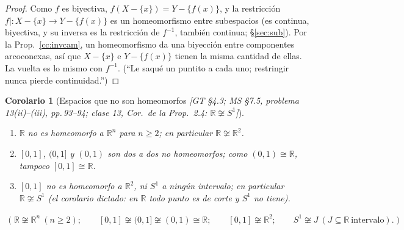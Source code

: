 \documentclass[11pt,a4paper]{article}
\newcommand{\lgc}[1]{\par\vspace{-3pt}\begin{gather*}\big(\;#1\;\big)\end{gather*}\vspace{-6pt}}
\newcommand{\figtit}[1]{\par\vspace{2pt}{\footnotesize\itshape #1}\par}
\theoremstyle{definition}
\theoremstyle{plain}
\newtheorem{corolario}[definicion]{Corolario}
\newcommand{\fnt}[1]{{\normalfont\small\itshape\color{gray!150!black}[#1]}}
\newcommand{\R}{\mathbb{R}}
\begin{document}
\begin{proof}
Como $f$ es biyectiva, $f(X-\{x\})=Y-\{f(x)\}$, y la restricción $f|:X-\{x\}\to Y-\{f(x)\}$ es un homeomorfismo entre subespacios (es continua, biyectiva, y su inversa es la restricción de $f^{-1}$, también continua; \S\ref{sec:sub}). Por la Prop.~\ref{cc:invcam}, un homeomorfismo da una biyección entre componentes arcoconexas, así que $X-\{x\}$ e $Y-\{f(x)\}$ tienen la misma cantidad de ellas. La vuelta es lo mismo con $f^{-1}$. (``Le saqué un puntito a cada uno; restringir nunca pierde continuidad.'')
\end{proof}

\begin{figure}[ht]
\centering
{}
\figtit{Figura 26. Invarianza de los puntos de corte (dibujo de la clase 13): al sacar $x$ y $f(x)$, la restricción $\tilde f$ sigue siendo un homeomorfismo, y dos componentes de un lado son dos del otro.}
\end{figure}

\begin{corolario}[Espacios que no son homeomorfos \fnt{GT \S4.3; MS \S7.5, problema 13(ii)--(iii), pp.\,93--94; clase 13, Cor.\ de la Prop.\ 2.4: $\R\not\cong S^1$}]\label{cc:nohomeo}
\begin{enumerate}[label=(\alph*),leftmargin=2.2em,itemsep=0pt]
\item $\R$ no es homeomorfo a $\R^n$ para $n\ge2$; en particular $\R\not\cong\R^2$.
\item $[0,1]$, $(0,1]$ y $(0,1)$ son dos a dos no homeomorfos; como $(0,1)\cong\R$, tampoco $[0,1]\cong\R$.
\item $[0,1]$ no es homeomorfo a $\R^2$, ni $S^1$ a ningún intervalo; en particular $\R\not\cong S^1$ (el corolario dictado: en $\R$ todo punto es de corte y $S^1$ no tiene).
\end{enumerate}
\lgc{\R\not\cong\R^n\ (n\ge2);\qquad [0,1]\not\cong(0,1]\not\cong(0,1)\cong\R;\qquad [0,1]\not\cong\R^2;\qquad S^1\not\cong J\ (J\subseteq\R\ \text{intervalo}).}
\end{corolario}
\end{document}
